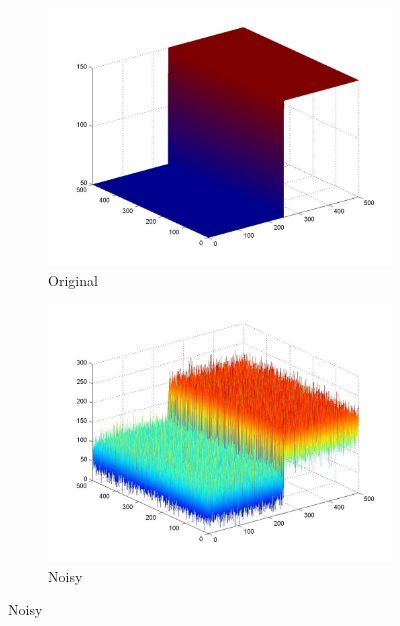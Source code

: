 \documentclass[a4paper, 10pt, conference] {article}
\begin{document}
 \begin{figure}[H]
 	\begin{subfigure}{0.29\textwidth} 						\includegraphics[scale=0.13]{original_1.JPG}
		\caption{Original}
	\end{subfigure}
	\begin{subfigure}{0.29\textwidth} 						\includegraphics[scale=0.13]{noisy_1.JPG}
		\caption{Noisy}
	\end{subfigure}

\end{figure}
\end{document}
